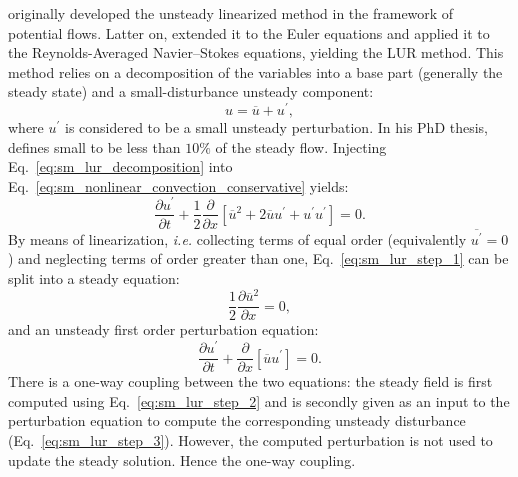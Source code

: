 
\citet{Verdon1984} originally developed the unsteady linearized 
method in the framework of potential flows. Latter on, \citet{Hall1989}
extended it to the Euler equations and
\citet{Clark2000} applied it to the Reynolds-Averaged Navier--Stokes equations,
yielding the LUR method.
This method relies on a decomposition of the variables
into a base part (generally the steady state) 
and a small-disturbance unsteady component:
\begin{equation}
	u = \overline{u} + u^\prime,
	\label{eq:sm_lur_decomposition}
\end{equation}
where $u^\prime$ is considered to be a small unsteady perturbation.
In his PhD thesis,
\citet{Hall1987} defines small to be less than $10\%$ of the
steady flow.
Injecting Eq.~\eqref{eq:sm_lur_decomposition} into 
Eq.~\eqref{eq:sm_nonlinear_convection_conservative} yields:
\begin{equation}
	\frac{\partial u^\prime}{\partial t} + 
	\frac{1}{2}\frac{\partial}{\partial x} \left[
	\overline{u}^2 + 2 \overline{u} u^\prime + u^\prime u^\prime \right] = 
	0.
	\label{eq:sm_lur_step_1}
\end{equation}
By means of linearization, \emph{i.e.} collecting terms
of equal order (equivalently $\overline{u^\prime} = 0$) 
and neglecting terms of order greater than one, 
Eq.~\eqref{eq:sm_lur_step_1} can be split
into a steady equation:
\begin{equation}
	\frac{1}{2} \frac{\partial \overline{u}^2}{\partial x} = 0,
	\label{eq:sm_lur_step_2}
\end{equation}
and an unsteady first order perturbation equation:
\begin{equation}
	\frac{\partial u^\prime}{\partial t} +
	\frac{\partial}{\partial x} \left[
	\overline{u} u^\prime \right] = 
	0.
	\label{eq:sm_lur_step_3}
\end{equation}
There is a one-way coupling between the two equations:
the steady field
is first computed using Eq.~\eqref{eq:sm_lur_step_2}
and is secondly given as an input to the
perturbation equation to compute
the corresponding unsteady disturbance (Eq.~\eqref{eq:sm_lur_step_3}). 
However, the computed
perturbation is not used to update the steady solution.
Hence the one-way coupling.


